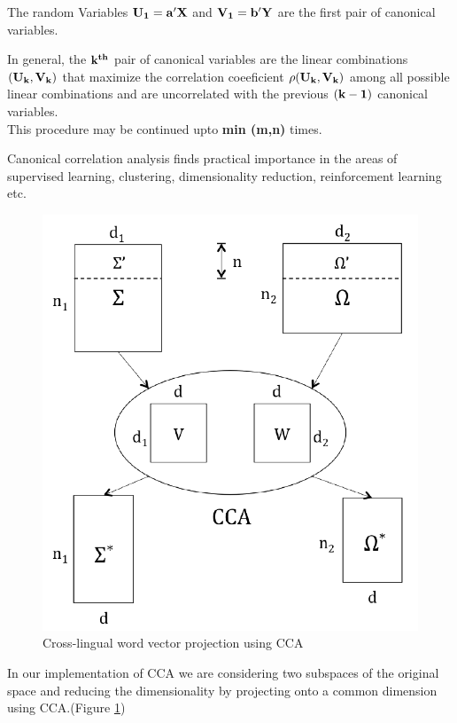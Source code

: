 \documentclass{article} %
\begin{document}
	The random Variables $\bf{U_1 = a'X}$ and $\bf{V_1 = b'Y}$ are the first pair of canonical variables.
	
	In general, the $\bf{k^{th}}$ pair of canonical variables are the linear combinations $(\bf{U_k,V_k})$ that maximize the correlation coeeficient $\bf{\rho}(\bf{U_k,V_k})$ among all possible linear combinations and are uncorrelated with the previous $\bf{(k-1)}$ canonical variables.\\
	This procedure may be continued upto {\bf{min (m,n)}} times.
	
	Canonical correlation analysis finds practical importance in the areas of supervised learning, clustering, dimensionality reduction, reinforcement learning etc.
	
	\begin{figure}[H]
		\begin{center}
			\includegraphics[scale = 0.6]{Figures/cca.png}
			\caption{Cross-lingual word vector projection using CCA	}
			\label{fig:CCA_implementation}
		\end{center}
	\end{figure}
	
	In our implementation of CCA we are considering two subspaces of the original space and reducing the dimensionality by projecting onto a common dimension using CCA.(Figure \ref{fig:CCA_implementation})
	
\end{document}
